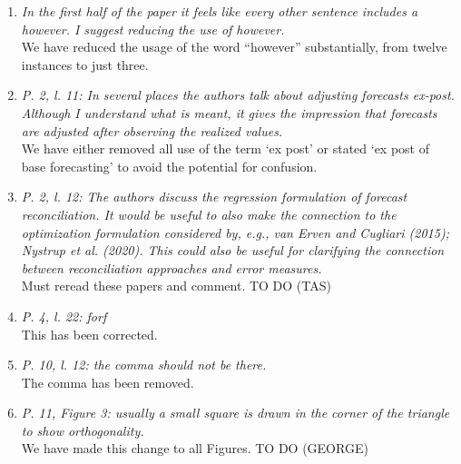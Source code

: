\documentclass[a4paper,11pt]{article}
\begin{document}
	    \begin{enumerate}
	    
	    \item \textit{In the first half of the paper it feels like every other sentence includes a however. I suggest reducing the use of however.}\\
	    
	    We have reduced the usage of the word ``however'' substantially, from twelve instances to just three.\\
	    
	    \item \textit{P. 2, l. 11: In several places the authors talk about adjusting forecasts ex-post. Although I understand what is meant, it gives the impression that forecasts are adjusted after observing the realized values.}\\
	    
	    We have either removed all use of the term `ex post' or stated `ex post of base forecasting' to avoid the potential for confusion.\\
	    
	    \item \textit{P. 2, l. 12: The authors discuss the regression formulation of forecast reconciliation. It would be useful to also make the connection to the optimization formulation considered by, e.g., van Erven and Cugliari (2015); Nystrup et al. (2020). This could also be useful for clarifying the connection between reconciliation approaches and error measures.}\\
	    
	    Must reread these papers and comment.  TO DO (TAS)\\
	    
	    \item \textit{P. 4, l. 22: forf}\\
	    This has been corrected.\\
	    
	    \item \textit{P. 10, l. 12: the comma should not be there.}\\
	    The comma has been removed.\\
	    
	    \item \textit{P. 11, Figure 3: usually a small square is drawn in the corner of the triangle to show orthogonality.}\\
	    We have made this change to all Figures. TO DO (GEORGE)\\
	    

\end{enumerate}
\end{document}
